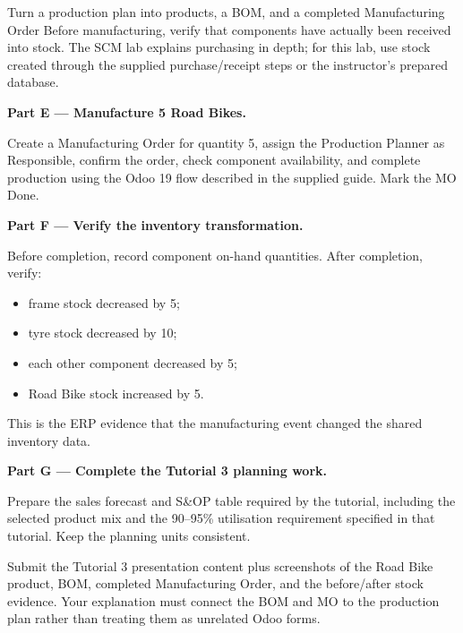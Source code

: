 \begin{labproject}{Turn a production plan into products, a BOM, and a completed Manufacturing Order}
Before manufacturing, verify that components have actually been received into stock. The SCM lab explains purchasing in depth; for this lab, use stock created through the supplied purchase/receipt steps or the instructor's prepared database.

\medskip\noindent\textbf{Part E --- Manufacture 5 Road Bikes.}

Create a Manufacturing Order for quantity 5, assign the Production Planner as Responsible, confirm the order, check component availability, and complete production using the Odoo 19 flow described in the supplied guide. Mark the MO Done.

\medskip\noindent\textbf{Part F --- Verify the inventory transformation.}

Before completion, record component on-hand quantities. After completion, verify:
\begin{itemize}
  \item frame stock decreased by 5;
  \item tyre stock decreased by 10;
  \item each other component decreased by 5;
  \item Road Bike stock increased by 5.
\end{itemize}

This is the ERP evidence that the manufacturing event changed the shared inventory data.

\medskip\noindent\textbf{Part G --- Complete the Tutorial 3 planning work.}

Prepare the sales forecast and S\&OP table required by the tutorial, including the selected product mix and the 90--95\% utilisation requirement specified in that tutorial. Keep the planning units consistent.
\end{labproject}

\begin{labdeliverable}
Submit the Tutorial 3 presentation content plus screenshots of the Road Bike product, BOM, completed Manufacturing Order, and the before/after stock evidence. Your explanation must connect the BOM and MO to the production plan rather than treating them as unrelated Odoo forms.
\end{labdeliverable}
